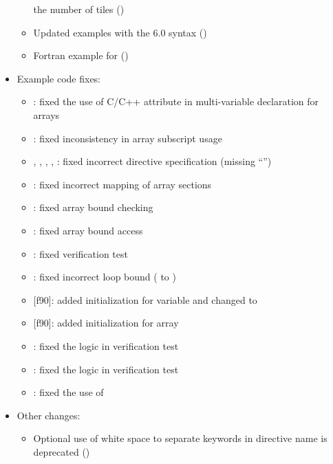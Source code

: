 \begin{itemize}
\begin{itemize}
    the number of tiles
    ()
  \item Updated  examples with the 6.0 syntax
    ()
  \item Fortran example for 
    ()
\end{itemize}
\item Example code fixes:
\begin{itemize}
  \item {}: fixed the use of C/C++ 
    attribute in multi-variable declaration for arrays
  \item {}: fixed inconsistency in array subscript usage
  \item {}, , ,
     , : fixed incorrect directive
     specification (missing ``'')
  \item {}: fixed incorrect mapping of array sections
  \item {}: fixed array bound checking
  \item {}: fixed array bound access
  \item {}: fixed verification test
  \item {}: fixed incorrect loop bound ( to )
  \item {}[f90]: added initialization for
     variable  and changed  to 
  \item {}[f90]: added initialization for array 
  \item {}: fixed the logic in verification test
  \item {}: fixed the logic in verification test
  \item {}: fixed the use of 
\end{itemize}
\item Other changes:
\begin{itemize}
  \item Optional use of white space to separate keywords in directive
    name is deprecated
    ()

\end{itemize}
\end{itemize}
